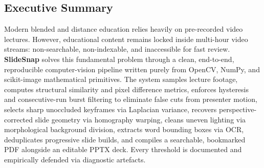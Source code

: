 \documentclass[10pt,a4paper]{article}
\begin{document}

\vfill
\newpage

\tableofcontents
\vspace{8mm}

\subsection*{Executive Summary}
Modern blended and distance education relies heavily on pre-recorded video lectures. However, educational content remains locked inside multi-hour video streams: non-searchable, non-indexable, and inaccessible for fast review. \textbf{SlideSnap} solves this fundamental problem through a clean, end-to-end, reproducible computer-vision pipeline written purely from OpenCV, NumPy, and scikit-image mathematical primitives. The system samples lecture footage, computes structural similarity and pixel difference metrics, enforces hysteresis and consecutive-run burst filtering to eliminate false cuts from presenter motion, selects sharp unoccluded keyframes via Laplacian variance, recovers perspective-corrected slide geometry via homography warping, cleans uneven lighting via morphological background division, extracts word bounding boxes via OCR, deduplicates progressive slide builds, and compiles a searchable, bookmarked PDF alongside an editable PPTX deck. Every threshold is documented and empirically defended via diagnostic artefacts.
\end{document}
